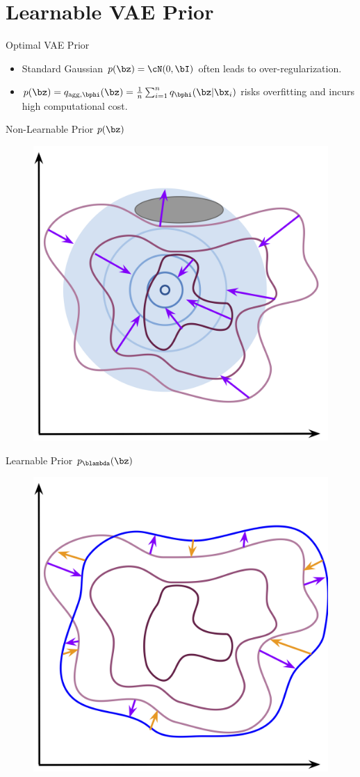 \documentclass{beamer}
\begin{document}
\section{Learnable VAE Prior}
\begin{frame}{Optimal VAE Prior}
	\begin{itemize}
		\item Standard Gaussian $p(\bz) = \cN(0, \bI)$ often leads to over-regularization.
		\item $p(\bz) = q_{\text{agg}, \bphi}(\bz) = \frac{1}{n}\sum_{i=1}^n q_{\bphi}(\bz| \bx_i)$ risks overfitting and incurs high computational cost.
	\end{itemize}
    \eqpause
	\vspace{-0.5cm}
	\begin{minipage}[t]{0.5\columnwidth}
		\begin{block}{Non-Learnable Prior $p(\bz)$}
			\begin{figure}[h]
				\centering
				\includegraphics[width=0.6\linewidth]{figs/non_learnable_prior}
			\end{figure}
		\end{block}
	\end{minipage}%
	\begin{minipage}[t]{0.5\columnwidth}
		\begin{block}{Learnable Prior $p_{\blambda}(\bz)$}
			\begin{figure}[h]
				\centering
				\includegraphics[width=0.6\linewidth]{figs/learnable_prior}

\end{figure}
\end{block}
\end{minipage}
\end{frame}
\end{document}
